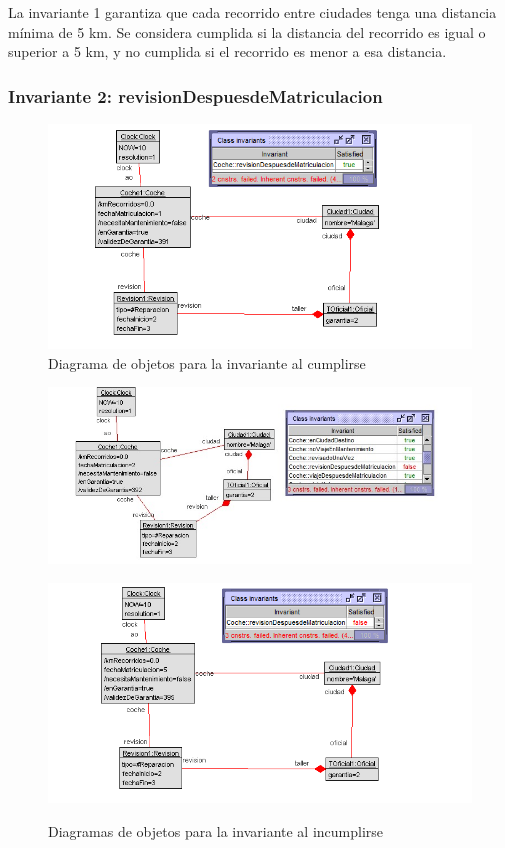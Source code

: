 \documentclass[12pt.a4paper]{article}
\begin{document}
La invariante 1 garantiza que cada recorrido entre ciudades tenga una distancia mínima de 5 km. Se considera cumplida si la distancia del recorrido es igual o superior a 5 km, y no cumplida si el recorrido es menor a esa distancia.

\subsubsection{Invariante 2: revisionDespuesdeMatriculacion}
\begin{figure}[H]
    \centering
     \includegraphics[width=0.75\linewidth]{Soils/2_v2.png}
     \caption{Diagrama de objetos para la invariante al cumplirse}
     \label{Diagrama del sistema de aviacion}
\end{figure}

\begin{figure}[H]
    \centering
    \begin{minipage}{0.49\textwidth}
        \centering
        \includegraphics[width=1\linewidth]{Soils/2.jpg}
        \label{fig:diagrama1}
    \end{minipage}
    \hfill
    \begin{minipage}{0.49\textwidth}
        \centering
        \includegraphics[width=1\linewidth]{Soils/2_v3.png}
        \label{fig:diagrama2}
    \end{minipage}
    \caption{Diagramas de objetos para la invariante al incumplirse}
    \label{fig:diagrama_invariante}
\end{figure}
\end{document}
